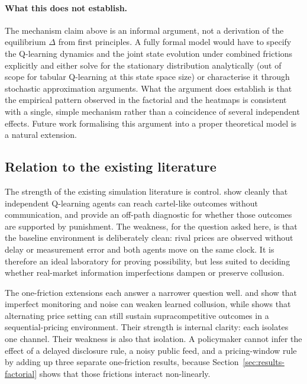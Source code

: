 \paragraph{What this does not establish.} The mechanism claim above is an informal argument, not a derivation of the equilibrium $\Delta$ from first principles. A fully formal model would have to specify the Q-learning dynamics and the joint state evolution under combined frictions explicitly and either solve for the stationary distribution analytically (out of scope for tabular Q-learning at this state space size) or characterise it through stochastic approximation arguments. What the argument does establish is that the empirical pattern observed in the factorial and the heatmaps is consistent with a single, simple mechanism rather than a coincidence of several independent effects. Future work formalising this argument into a proper theoretical model is a natural extension.

\subsection{Relation to the existing literature}

The strength of the existing simulation literature is control. \citet{calvano2020} show cleanly that independent Q-learning agents can reach cartel-like outcomes without communication, and \citet{calvano2023} provide an off-path diagnostic for whether those outcomes are supported by punishment. The weakness, for the question asked here, is that the baseline environment is deliberately clean: rival prices are observed without delay or measurement error and both agents move on the same clock. It is therefore an ideal laboratory for proving possibility, but less suited to deciding whether real-market information imperfections dampen or preserve collusion.

The one-friction extensions each answer a narrower question well. \citet{calvano2021} and \citet{zhang2025} show that imperfect monitoring and noise can weaken learned collusion, while \citet{klein2021} shows that alternating price setting can still sustain supracompetitive outcomes in a sequential-pricing environment. Their strength is internal clarity: each isolates one channel. Their weakness is also that isolation. A policymaker cannot infer the effect of a delayed disclosure rule, a noisy public feed, and a pricing-window rule by adding up three separate one-friction results, because Section~\ref{sec:results-factorial} shows that those frictions interact non-linearly.

